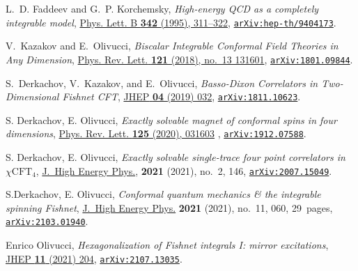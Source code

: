\documentclass[a4paper,11pt]{article}
\numberwithin{equation}{section}
\begin{document}
\begin{thebibliography}{99}
L.~D. Faddeev and G.~P. Korchemsky, {\em High-energy QCD as a completely
	integrable model},
\href{https://www.sciencedirect.com/science/article/abs/pii/037026939401363H?via%3Dihub}{Phys. Lett. B {\bf 342} (1995),  311--322},
\href{https://arxiv.org/abs/hep-th/9404173}{\tt \href{https://arxiv.org/abs/hep-th/9404173}{\texttt{arXiv:hep-th/9404173}}}.


V.~Kazakov and E.~Olivucci, {\it {Biscalar Integrable Conformal Field Theories
		in Any Dimension}},
\href{https://journals.aps.org/prl/abstract/10.1103/PhysRevLett.121.131601}{{Phys. Rev. Lett.} {\bf 121} (2018), no.~13 131601},
\href{http://arxiv.org/abs/1801.09844}{{\tt \href{https://arxiv.org/abs/1801.09844}{\texttt{arXiv:1801.09844}}}}.

S.~Derkachov, V.~Kazakov, and E.~Olivucci, {\it {Basso-Dixon Correlators in
		Two-Dimensional Fishnet CFT}},
\href{https://link.springer.com/article/10.1007/JHEP04(2019)032}{{JHEP} {\bf 04} (2019) 032},
\href{http://arxiv.org/abs/1811.10623}{{\tt \href{https://arxiv.org/abs/1811.10623}{\texttt{arXiv:1811.10623}}}}.


S. Derkachov, E. Olivucci, \textit{Exactly solvable magnet of conformal spins in four
	dimensions}, \href{https://doi.org/10.1103/physrevlett.125.031603}{Phys. Rev. Lett. \textbf{125} (2020), 031603} ,
\href{https://arxiv.org/abs/1912.07588}{\tt \href{https://arxiv.org/abs/1912.07588}{\texttt{arXiv:1912.07588}}}.

S. Derkachov, E. Olivucci, \textit{Exactly solvable single-trace four point correlators
	in {$\chi \mathrm{CFT}_4$}}, \href{https://doi.org/10.1007/jhep02(2021)146}{J.~High Energy Phys.}, \textbf{2021}
(2021), no.~2, 146, \href{https://arxiv.org/abs/2007.15049}{\tt \href{https://arxiv.org/abs/2007.15049}{\texttt{arXiv:2007.15049}}}.

S.Derkachov, E. Olivucci, \textit{Conformal quantum mechanics \& the integrable
	spinning {F}ishnet}, \href{https://doi.org/10.1007/jhep11(2021)060}{J.~High Energy Phys.} \textbf{2021} (2021),
no.~11, 060, 29~pages, \href{https://arxiv.org/abs/2103.01940}{\tt \href{https://arxiv.org/abs/2103.01940}{\texttt{arXiv:2103.01940}}}.

Enrico Olivucci,
\textit{Hexagonalization of Fishnet integrals I: mirror excitations},
\href{https://doi.org/10.1007/JHEP11%282021%29204}{JHEP \textbf{11} (2021) 204},
\href{https://doi.org/10.48550/arXiv.2107.13035}
{\texttt{\href{https://arxiv.org/abs/2107.13035}{\texttt{arXiv:2107.13035}}}}.


\end{thebibliography}
\end{document}
